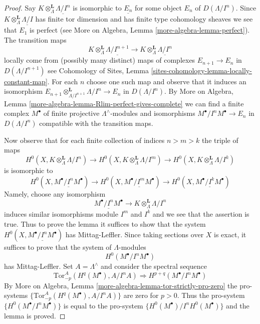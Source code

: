 \begin{proof}
Say $K \otimes_\Lambda^\mathbf{L} \underline{\Lambda/I^n}$ is isomorphic
to $\underline{E_n}$ for some object $E_n$ of $D(\Lambda/I^n)$.
Since $K \otimes_\Lambda^\mathbf{L} \underline{\Lambda/I}$ has
finite tor dimension and has finite type cohomology sheaves
we see that $E_1$ is perfect (see
More on Algebra, Lemma \ref{more-algebra-lemma-perfect}). The transition maps
$$
K \otimes_\Lambda^\mathbf{L} \underline{\Lambda/I^{n + 1}}
\to
K \otimes_\Lambda^\mathbf{L} \underline{\Lambda/I^n}
$$
locally come from (possibly many distinct) maps of complexes
$E_{n + 1} \to E_n$ in $D(\Lambda/I^{n + 1})$ see
Cohomology of Sites, Lemma \ref{sites-cohomology-lemma-locally-constant-map}.
For each $n$ choose one such map and observe that it induces
an isomorphism
$E_{n + 1} \otimes_{\Lambda/I^{n + 1}}^\mathbf{L} \Lambda/I^n \to E_n$
in $D(\Lambda/I^n)$. By
More on Algebra, Lemma \ref{more-algebra-lemma-Rlim-perfect-gives-complete}
we can find a finite complex $M^\bullet$ of finite projective
$\Lambda^\wedge$-modules and isomorphisms $M^\bullet/I^nM^\bullet \to E_n$
in $D(\Lambda/I^n)$ compatible with the transition maps.

\medskip\noindent
Now observe that for each finite collection of indices
$n > m > k$ the triple of maps
$$
H^0(X, K \otimes_\Lambda^\mathbf{L} \Lambda/I^n)
\to
H^0(X, K \otimes_\Lambda^\mathbf{L} \Lambda/I^m)
\to
H^0(X, K \otimes_\Lambda^\mathbf{L} \Lambda/I^k)
$$
is isomorphic to
$$
H^0(X, \underline{M^\bullet/I^nM^\bullet})
\to
H^0(X, \underline{M^\bullet/I^mM^\bullet})
\to
H^0(X, \underline{M^\bullet/I^kM^\bullet})
$$
Namely, choose any isomorphism
$$
\underline{M^\bullet/I^nM^\bullet} \to
K \otimes_\Lambda^\mathbf{L} \Lambda/I^n
$$
induces similar isomorphisms module $I^m$ and $I^k$ and we see that
the assertion is true. Thus to prove the lemma it suffices to show that
the system
$H^0(X, \underline{M^\bullet/I^nM^\bullet})$ has Mittag-Leffler.
Since taking sections over $X$ is exact, it suffices to prove that
the system of $\Lambda$-modules
$$
H^0(M^\bullet/I^nM^\bullet)
$$
has Mittag-Leffler. Set $A = \Lambda^\wedge$ and consider the spectral
sequence
$$
\text{Tor}_{-p}^A(H^q(M^\bullet), A/I^nA) \Rightarrow
H^{p + q}(M^\bullet/I^nM^\bullet)
$$
By More on Algebra, Lemma \ref{more-algebra-lemma-tor-strictly-pro-zero}
the pro-systems $\{\text{Tor}_{-p}^A(H^q(M^\bullet), A/I^nA)\}$ are zero
for $p > 0$. Thus the pro-system $\{H^0(M^\bullet/I^nM^\bullet)\}$
is equal to the pro-system $\{H^0(M^\bullet)/I^nH^0(M^\bullet)\}$
and the lemma is proved.
\end{proof}

